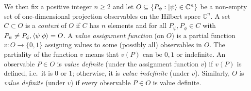 \documentclass[l1pt]{elsarticle}
\begin{document}
We then fix a positive integer $n\geq 2$ and let $O \subseteq \{  P_{\psi}:  \ket{\psi} \in \mathbb{C}^{n} \}$ be a non-empty set of one-dimensional projection observables on the Hilbert space $\mathbb{C}^{n}$.
A set $C \subset O$ is a {\it  context} of $O$ if $C$ has $n$ elements and for all $P_{\psi}, P_{\phi} \in C$ with $P_{\psi} \neq P_{\phi}, \braket{\psi}{\phi} = O$.
A  {\it  value assignment function} (on $O$) is a partial function $v:O\to \{0,1\}$ assigning values to some (possibly all) observables in $O$.  The partiality of the  function $v$ means that $v(P)$ can be $0,1$ or indefinite.
An observable $P \in O$ is  {\it  value definite} (under the assignment function $v$)  if $v(P)$ is defined, i.e.~it is 0 or 1; otherwise, it is  {\it  value indefinite} (under $v$). Similarly, $O$ is {\it  value definite} (under $v$) if every observable $P \in O$ is value definite.
\end{document}
